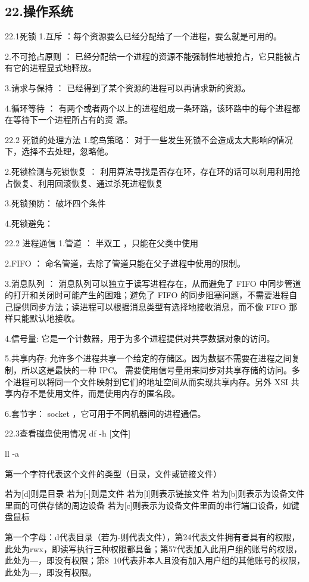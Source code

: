 \documentclass[UTF8]{ctexart}
\begin{document}
\subsection{22.操作系统}

22.1死锁
1.互斥 ：每个资源要么已经分配给了一个进程，要么就是可用的。

2.不可抢占原则 ： 已经分配给一个进程的资源不能强制性地被抢占，它只能被占有它的进程显式地释放。

3.请求与保持 ： 已经得到了某个资源的进程可以再请求新的资源。

4.循环等待 ： 有两个或者两个以上的进程组成一条环路，该环路中的每个进程都在等待下一个进程所占有的资
源。

22.2 死锁的处理方法
1.鸵鸟策略： 对于一些发生死锁不会造成太大影响的情况下，选择不去处理，忽略他。

2.死锁检测与死锁恢复 ： 利用算法寻找是否存在环，存在环的话可以利用利用抢占恢复、利用回滚恢复、通过杀死进程恢复

3.死锁预防： 破坏四个条件

4.死锁避免：

22.2 进程通信
1.管道 ： 半双工 ，只能在父类中使用

2.FIFO ： 命名管道，去除了管道只能在父子进程中使用的限制。

3.消息队列 ： 消息队列可以独立于读写进程存在，从而避免了 FIFO 中同步管道的打开和关闭时可能产生的困难；避免了 FIFO 的同步阻塞问题，不需要进程自己提供同步方法；读进程可以根据消息类型有选择地接收消息，而不像 FIFO 那样只能默认地接收。

4.信号量: 它是一个计数器，用于为多个进程提供对共享数据对象的访问。

5.共享内存: 允许多个进程共享一个给定的存储区。因为数据不需要在进程之间复制，所以这是最快的一种 IPC。
需要使用信号量用来同步对共享存储的访问。多个进程可以将同一个文件映射到它们的地址空间从而实现共享内存。另外 XSI 共享内存不是使用文件，而是使用内存的匿名段。

6.套节字： socket ，它可用于不同机器间的进程通信。

22.3查看磁盘使用情况
df -h [文件]

ll -a

第一个字符代表这个文件的类型（目录，文件或链接文件）

若为[d]则是目录
若为[-]则是文件
若为[l]则表示链接文件
若为[b]则表示为设备文件里面的可供存储的周边设备
若为[c]则表示为设备文件里面的串行端口设备，如键盘鼠标

第一个字母：d代表目录（若为-则代表文件），第24代表文件拥有者具有的权限，此处为rwx，即读写执行三种权限都具备；第57代表加入此用户组的账号的权限，此处为—，即没有权限；第8~10代表非本人且没有加入用户组的其他账号的权限，此处为—，即没有权限。
\end{document}
